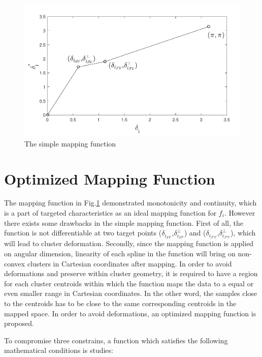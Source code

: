\begin{figure}[t]
\centering
\includegraphics[scale=0.7]{Fig/simple_spline1.pdf}
\caption{The simple mapping function}
\label{fig:simple_spline}
\end{figure}

\section{Optimized Mapping Function}

The mapping function in Fig.\ref{fig:simple_spline} demonstrated monotonicity and continuity, which is a part of targeted characteristics as an ideal mapping function for $f_i$. However there exists some drawbacks in the simple mapping function. First of all, the function is not differentiable at two target points ($\delta_{i_{{\mathcal{SV}}}}$,$\delta^{\perp}_{i_{{\mathcal{SV}}}}$) and ($\delta_{i_{{\mathcal{FV}}}}$,$\delta^{\perp}_{i_{{\mathcal{FV}}}}$), which will lead to cluster deformation. Secondly, since the mapping function is applied on angular dimension, linearity of each spline in the function will bring on non-convex clusters in Cartesian coordinates after mapping. In order to avoid deformations and preserve within cluster geometry, it is required to have a region for each cluster centroids within which the function maps the data to a equal or even smaller range in Cartesian coordinates. In the other word, the samples close to the centroids has to be close to the same corresponding centroids in the mapped space. In order to avoid deformations, an optimized mapping function is proposed.

To compromise three constrains, a function which satisfies the following mathematical conditions is studies:

